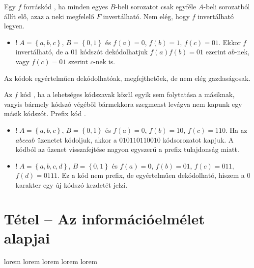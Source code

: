 \documentclass[main.tex]{subfiles}
\begin{document}
  Egy $f$ forráskód ,
  ha minden egyes $B$-beli sorozatot csak egyféle
  $A$-beli sorozatból állít elő, azaz a neki
  megfelelő $F$ invertálható. Nem elég, hogy $f$
  invertálható legyen.
  \begin{itemize}
    \item $! \; A = \left\{a, b, c\right\}$, $B = \left\{ 0, 1\right\}$
    és $f(a) = 0$, $f(b) = 1$, $f(c) = 01$. Ekkor $f$ invertálható,
    de a 01 kódszót dekódolhatjuk $f(a) f(b) = 01$ ezerint $ab$-nek,
    vagy $f(c)=01$ szerint $c$-nek is.
  \end{itemize}
  Az 
  kódok egyértelműen dekódolhatóak, megfejthetőek,
  de nem elég gazdaságosak.

  Az $f$ kód , ha a lehetséges kódszavak közül
  egyik sem folytatása a másiknak, vagyis bármely kódszó
  végéből bármekkora szegmenst levágva nem kapunk egy másik
  kódszót. Prefix kód .
  \begin{itemize}
    \item $! \; A = \left\{a, b, c\right\}$, $B = \left\{ 0, 1\right\}$
    és $f(a) = 0$, $f(b) = 10$, $f(c) = 110$. Ha az $abccab$ üzenetet
    kódoljuk, akkor a $010110110010$ kódsorozatot kapjuk. A kódból
    az üzenet visszafejtése nagyon egyszerű a prefix tulajdonság miatt.

    \item  $! \; A = \left\{a, b, c, d\right\}$, $B = \left\{ 0, 1\right\}$
    és $f(a) = 0$, $f(b) = 01$, $f(c) = 011$, $f(d)=0111$.
    Ez a kód nem prefix, de egyértelműen dekódolható, hiszem a $0$
    karakter egy új kódszó kezdetét jelzi.
  \end{itemize}


  \section{Tétel – Az információelmélet alapjai} %

  lorem
  lorem
  lorem
  lorem
  lorem
\end{document}
